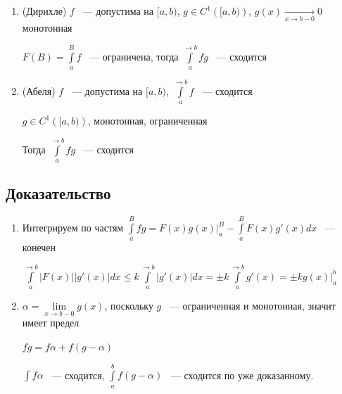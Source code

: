\documentclass{article}
\begin{document}
            \begin{enumerate}
            
                \item (Дирихле) $f$ ~--- допустима на $[a, b)$, $g \in C^1 \left( [a, b) \right)$, $g(x) \xrightarrow[x \rightarrow b - 0]{} 0$ монотонная
                
                    $F(B) = \int\limits^B_a f$ ~--- ограничена, тогда $\int\limits^{\rightarrow b}_a fg$ ~--- сходится
                    
                \item (Абеля) $f$ ~--- допустима на $[a, b)$, $\int\limits^{\rightarrow b}_a f$ ~--- сходится
                
                    $g \in C^1 \left([a, b) \right)$, монотонная, ограниченная
                    
                    Тогда $\int\limits^{\rightarrow b}_a fg$ ~--- сходится
                
            \end{enumerate}
            
        \subsection{Доказательство}
        
            \begin{enumerate}
            
                \item Интегрируем по частям $\int\limits^B_a fg = F(x) g(x) \bigg|^B_a - \int\limits^B_a F(x) g'(x) dx$ ~--- конечен
            
                $\int\limits^{\rightarrow b}_a \left| F(x) \right| | g'(x) | dx \leq k \int\limits^{\rightarrow b}_a | g'(x) | dx = \pm k \int\limits^{\rightarrow b}_a g'(x) = \pm k g(x) \bigg|^b_a$
            
                \item $\alpha = \lim\limits_{x \rightarrow b- 0} g(x)$, поскольку $g$ ~--- ограниченная и монотонная, значит имеет предел
            
                $fg = f \alpha + f(g - \alpha)$
            
                $\int f \alpha$ ~--- сходится, $\int\limits^b_a f(g - \alpha)$ ~--- сходится по уже доказанному.
            
            \end{enumerate}
            
\end{document}
